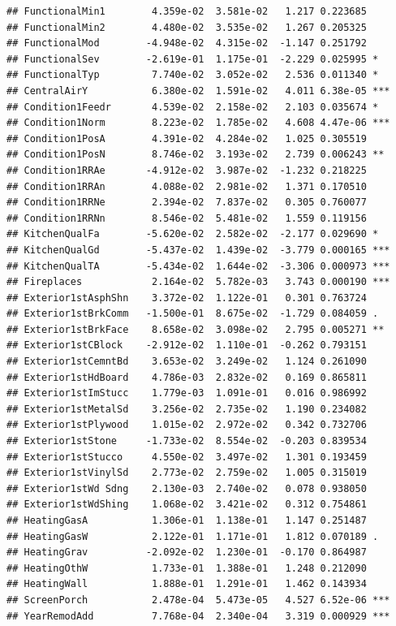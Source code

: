 \documentclass[american,]{article}
\theoremstyle{definition}
\theoremstyle{definition}
\theoremstyle{definition}
\theoremstyle{remark}
\begin{document}
\begin{verbatim}
## FunctionalMin1        4.359e-02  3.581e-02   1.217 0.223685    
## FunctionalMin2        4.480e-02  3.535e-02   1.267 0.205325    
## FunctionalMod        -4.948e-02  4.315e-02  -1.147 0.251792    
## FunctionalSev        -2.619e-01  1.175e-01  -2.229 0.025995 *  
## FunctionalTyp         7.740e-02  3.052e-02   2.536 0.011340 *  
## CentralAirY           6.380e-02  1.591e-02   4.011 6.38e-05 ***
## Condition1Feedr       4.539e-02  2.158e-02   2.103 0.035674 *  
## Condition1Norm        8.223e-02  1.785e-02   4.608 4.47e-06 ***
## Condition1PosA        4.391e-02  4.284e-02   1.025 0.305519    
## Condition1PosN        8.746e-02  3.193e-02   2.739 0.006243 ** 
## Condition1RRAe       -4.912e-02  3.987e-02  -1.232 0.218225    
## Condition1RRAn        4.088e-02  2.981e-02   1.371 0.170510    
## Condition1RRNe        2.394e-02  7.837e-02   0.305 0.760077    
## Condition1RRNn        8.546e-02  5.481e-02   1.559 0.119156    
## KitchenQualFa        -5.620e-02  2.582e-02  -2.177 0.029690 *  
## KitchenQualGd        -5.437e-02  1.439e-02  -3.779 0.000165 ***
## KitchenQualTA        -5.434e-02  1.644e-02  -3.306 0.000973 ***
## Fireplaces            2.164e-02  5.782e-03   3.743 0.000190 ***
## Exterior1stAsphShn    3.372e-02  1.122e-01   0.301 0.763724    
## Exterior1stBrkComm   -1.500e-01  8.675e-02  -1.729 0.084059 .  
## Exterior1stBrkFace    8.658e-02  3.098e-02   2.795 0.005271 ** 
## Exterior1stCBlock    -2.912e-02  1.110e-01  -0.262 0.793151    
## Exterior1stCemntBd    3.653e-02  3.249e-02   1.124 0.261090    
## Exterior1stHdBoard    4.786e-03  2.832e-02   0.169 0.865811    
## Exterior1stImStucc    1.779e-03  1.091e-01   0.016 0.986992    
## Exterior1stMetalSd    3.256e-02  2.735e-02   1.190 0.234082    
## Exterior1stPlywood    1.015e-02  2.972e-02   0.342 0.732706    
## Exterior1stStone     -1.733e-02  8.554e-02  -0.203 0.839534    
## Exterior1stStucco     4.550e-02  3.497e-02   1.301 0.193459    
## Exterior1stVinylSd    2.773e-02  2.759e-02   1.005 0.315019    
## Exterior1stWd Sdng    2.130e-03  2.740e-02   0.078 0.938050    
## Exterior1stWdShing    1.068e-02  3.421e-02   0.312 0.754861    
## HeatingGasA           1.306e-01  1.138e-01   1.147 0.251487    
## HeatingGasW           2.122e-01  1.171e-01   1.812 0.070189 .  
## HeatingGrav          -2.092e-02  1.230e-01  -0.170 0.864987    
## HeatingOthW           1.733e-01  1.388e-01   1.248 0.212090    
## HeatingWall           1.888e-01  1.291e-01   1.462 0.143934    
## ScreenPorch           2.478e-04  5.473e-05   4.527 6.52e-06 ***
## YearRemodAdd          7.768e-04  2.340e-04   3.319 0.000929 ***

\end{verbatim}
\end{document}
